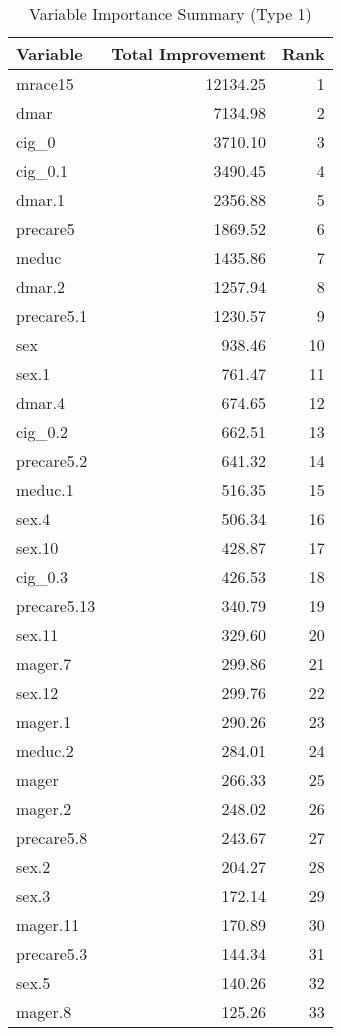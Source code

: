 \begingroup\small
\begin{longtable}{lrr}
  \caption{Variable Importance Summary (Type 1)}\label{tab:var_imp_summary_type1}\\
 \hline
Variable & Total Improvement & Rank \\ 
  \hline
mrace15 & 12134.25 & 1 \\ 
  dmar & 7134.98 & 2 \\ 
  cig_0 & 3710.10 & 3 \\ 
  cig_0.1 & 3490.45 & 4 \\ 
  dmar.1 & 2356.88 & 5 \\ 
  precare5 & 1869.52 & 6 \\ 
  meduc & 1435.86 & 7 \\ 
  dmar.2 & 1257.94 & 8 \\ 
  precare5.1 & 1230.57 & 9 \\ 
  sex & 938.46 & 10 \\ 
  sex.1 & 761.47 & 11 \\ 
  dmar.4 & 674.65 & 12 \\ 
  cig_0.2 & 662.51 & 13 \\ 
  precare5.2 & 641.32 & 14 \\ 
  meduc.1 & 516.35 & 15 \\ 
  sex.4 & 506.34 & 16 \\ 
  sex.10 & 428.87 & 17 \\ 
  cig_0.3 & 426.53 & 18 \\ 
  precare5.13 & 340.79 & 19 \\ 
  sex.11 & 329.60 & 20 \\ 
  mager.7 & 299.86 & 21 \\ 
  sex.12 & 299.76 & 22 \\ 
  mager.1 & 290.26 & 23 \\ 
  meduc.2 & 284.01 & 24 \\ 
  mager & 266.33 & 25 \\ 
  mager.2 & 248.02 & 26 \\ 
  precare5.8 & 243.67 & 27 \\ 
  sex.2 & 204.27 & 28 \\ 
  sex.3 & 172.14 & 29 \\ 
  mager.11 & 170.89 & 30 \\ 
  precare5.3 & 144.34 & 31 \\ 
  sex.5 & 140.26 & 32 \\ 
  mager.8 & 125.26 & 33 \\ 

\end{longtable}

